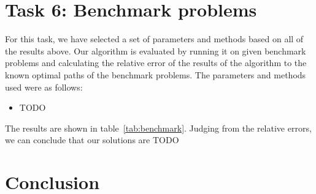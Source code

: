 \documentclass{report}
\begin{document}
\begin{table}[H]
\centering
{}
\caption{Results when using twenty subpopulations.}
\label{tab:diversity20}
\end{table}

\section{Task 6: Benchmark problems}
For this task, we have selected a set of parameters and methods based on all of the results above. Our algorithm is evaluated by running it on given benchmark problems and calculating the relative error of the results of the algorithm to the known optimal paths of the benchmark problems.
The parameters and methods used were as follows:
\begin{itemize}
	\item TODO
\end{itemize}
The results are shown in table~\ref{tab:benchmark}. Judging from the relative errors, we can conclude that our solutions are TODO
%


\section{Conclusion}
\end{document}
